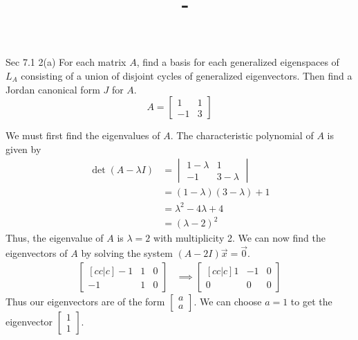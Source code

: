 \documentclass[answers,12pt,addpoints]{exam}
\author{\name}
\title{\course \ - \assignment}
\begin{document}
\maketitle


\newpage
\begin{questions}
    \question Sec 7.1 2(a)
    For each matrix $A$, find a basis for each generalized eigenspaces of $L_A$ consisting of a union of disjoint cycles of generalized eigenvectors. Then find a Jordan canonical form $J$ for $A$.
    $$A = \begin{bmatrix}
        1 & 1 \\
        -1 & 3
    \end{bmatrix}$$
    \begin{solution}
        We must first find the eigenvalues of $A$. The characteristic polynomial of $A$ is given by
        \begin{align*}
            \det(A - \lambda I) &= \begin{vmatrix}
                1 - \lambda & 1 \\
                -1 & 3 - \lambda
            \end{vmatrix} \\
            &= (1 - \lambda)(3 - \lambda) + 1 \\
            &= \lambda^2 - 4\lambda + 4 \\
            &= (\lambda - 2)^2
        \end{align*}
        Thus, the eigenvalue of $A$ is $\lambda = 2$ with multiplicity 2. We can now find the eigenvectors of $A$ by solving the system $(A - 2I)\vec{x} = \vec{0}$.
        \begin{align*}
            \begin{bmatrix}[cc|c]
                -1 & 1 & 0 \\
                -1 & 1 & 0
            \end{bmatrix}
            &\implies
            \begin{bmatrix}[cc|c]
                1 & -1 & 0 \\
                0 & 0 & 0
            \end{bmatrix}
        \end{align*}
        Thus our eigenvectors are of the form $\begin{bmatrix} a\\ a \end{bmatrix}$. We can choose $a = 1$ to get the eigenvector $\begin{bmatrix} 1\\ 1 \end{bmatrix}$. \\

\end{solution}
\end{questions}
\end{document}

